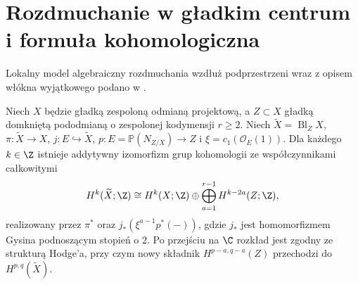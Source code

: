 \section{Rozdmuchanie w gładkim centrum i formuła kohomologiczna}
Lokalny model algebraiczny rozdmuchania wzdłuż podprzestrzeni wraz z opisem włókna wyjątkowego podano w .

\begin{twierdzenie}
\label{thm:xvii-blowup-general}
Niech $X$ będzie gładką zespoloną odmianą projektową,
a $Z\subset X$ gładką domkniętą pododmianą o zespolonej
kodymensji $r\ge2$. Niech $\widetilde X=\operatorname{Bl}_Z X$,
$\pi:\widetilde X\to X$, $j:E\hookrightarrow\widetilde X$,
$p:E=\mathbb P(N_{Z/X})\to Z$ i
$\xi=c_1(\mathcal O_E(1))$.
Dla każdego $k\in\Z$ istnieje addytywny izomorfizm
grup kohomologii ze współczynnikami całkowitymi
\[
H^k(\widetilde X;\Z)\cong H^k(X;\Z)\oplus
\bigoplus_{a=1}^{r-1}H^{k-2a}(Z;\Z),
\]
realizowany przez $\pi^*$ oraz $j_*(\xi^{a-1}p^*(-))$,
gdzie $j_*$ jest homomorfizmem Gysina podnoszącym stopień o $2$.
Po przejściu na $\C$ rozkład jest zgodny ze strukturą Hodge'a,
przy czym nowy składnik $H^{p-a,q-a}(Z)$ przechodzi do
$H^{p,q}(\widetilde X)$.
\end{twierdzenie}
